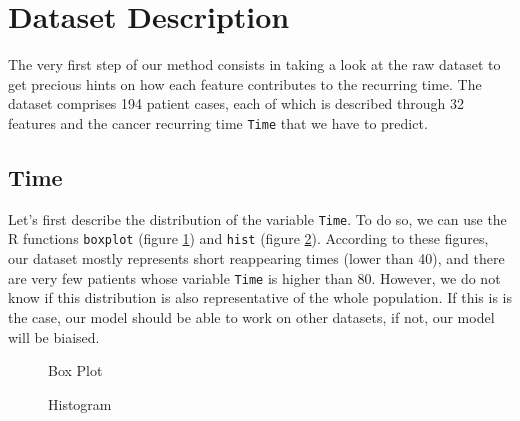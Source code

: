 \documentclass[]{report}
\newcommand{\inputtikz}[2]{%
	\scalebox{#1}{}  
}
\begin{document}
\section{Dataset Description}
The very first step of our method consists in taking a look at the raw dataset to get precious hints on how each feature contributes to the recurring time. The dataset comprises 194 patient cases, each of which is described through 32 features and the cancer recurring time \texttt{Time} that we have to predict.

\subsection{Time}
Let's first describe the distribution of the variable \texttt{Time}. To do so, we can use the R functions \texttt{boxplot} (figure \ref{fig:time_boxplot}) and \texttt{hist} (figure \ref{fig:time_hist}). According to these figures, our dataset mostly represents short reappearing times (lower than 40), and there are very few patients whose variable \texttt{Time} is higher than 80. However, we do not know if this distribution is also representative of the whole population. If this is is the case, our model should be able to work on other datasets, if not, our model will be biaised.

\begin{figure}[!hb]
	\centering
	\inputtikz{0.5}{Figures/time_boxplot.tex}
	\caption{Box Plot}
	\label{fig:time_boxplot}
\end{figure}

\begin{figure}[!h]
	\centering
	\inputtikz{0.5}{Figures/time_hist.tex}
	\caption{Histogram}
	\label{fig:time_hist}
\end{figure}
\end{document}
